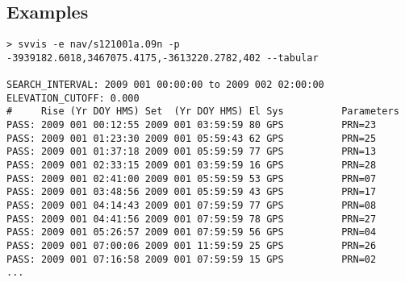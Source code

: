 \subsection{Examples}
\begin{verbatim}
> svvis -e nav/s121001a.09n -p -3939182.6018,3467075.4175,-3613220.2782,402 --tabular

SEARCH_INTERVAL: 2009 001 00:00:00 to 2009 002 02:00:00
ELEVATION_CUTOFF: 0.000
#     Rise (Yr DOY HMS) Set  (Yr DOY HMS) El Sys          Parameters
PASS: 2009 001 00:12:55 2009 001 03:59:59 80 GPS          PRN=23
PASS: 2009 001 01:23:30 2009 001 05:59:43 62 GPS          PRN=25
PASS: 2009 001 01:37:18 2009 001 05:59:59 77 GPS          PRN=13
PASS: 2009 001 02:33:15 2009 001 03:59:59 16 GPS          PRN=28
PASS: 2009 001 02:41:00 2009 001 05:59:59 53 GPS          PRN=07
PASS: 2009 001 03:48:56 2009 001 05:59:59 43 GPS          PRN=17
PASS: 2009 001 04:14:43 2009 001 07:59:59 77 GPS          PRN=08
PASS: 2009 001 04:41:56 2009 001 07:59:59 78 GPS          PRN=27
PASS: 2009 001 05:26:57 2009 001 07:59:59 56 GPS          PRN=04
PASS: 2009 001 07:00:06 2009 001 11:59:59 25 GPS          PRN=26
PASS: 2009 001 07:16:58 2009 001 07:59:59 15 GPS          PRN=02
...
\end{verbatim}

%
